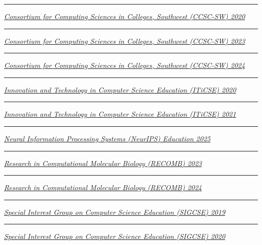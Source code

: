 \documentclass[margin,line]{res}
\begin{document}
\begin{resume}
\rule{-1mm}{5mm} \hspace*{4mm} \href{http://www.ccsc.org/southwestern/2020/index.php}{\textit{Consortium for Computing Sciences in Colleges, Southwest (CCSC-SW) 2020}}\\
\rule{-1mm}{5mm} \hspace*{4mm} \href{http://www.ccsc.org/southwestern/2023/index.php}{\textit{Consortium for Computing Sciences in Colleges, Southwest (CCSC-SW) 2023}}\\
\rule{-1mm}{5mm} \hspace*{4mm} \href{http://www.ccsc.org/southwestern/2024/index.php}{\textit{Consortium for Computing Sciences in Colleges, Southwest (CCSC-SW) 2024}}\\
\rule{-1mm}{5mm} \hspace*{4mm} \href{https://iticse.acm.org/ITiCSE2020}{\textit{Innovation and Technology in Computer Science Education (ITiCSE) 2020}}\\
\rule{-1mm}{5mm} \hspace*{4mm} \href{https://iticse.acm.org/2021}{\textit{Innovation and Technology in Computer Science Education (ITiCSE) 2021}}\\
\rule{-1mm}{5mm} \hspace*{4mm} \href{https://neurips.cc/Conferences/2025}{\textit{Neural Information Processing Systems (NeurIPS) Education 2025}}\\
\rule{-1mm}{5mm} \hspace*{4mm} \href{https://recomb.org/recomb2023/}{\textit{Research in Computational Molecular Biology (RECOMB) 2023}}\\
\rule{-1mm}{5mm} \hspace*{4mm} \href{https://recomb.org/recomb2024/}{\textit{Research in Computational Molecular Biology (RECOMB) 2024}}\\
\rule{-1mm}{5mm} \hspace*{4mm} \href{https://sigcse2019.sigcse.org/}{\textit{Special Interest Group on Computer Science Education (SIGCSE) 2019}}\\
\rule{-1mm}{5mm} \hspace*{4mm} \href{https://sigcse2020.sigcse.org/}{\textit{Special Interest Group on Computer Science Education (SIGCSE) 2020}}\\


\end{resume}
\end{document}
